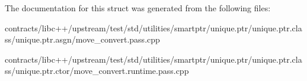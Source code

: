 The documentation for this struct was generated from the following files\+:\begin{DoxyCompactItemize}
\item 
contracts/libc++/upstream/test/std/utilities/smartptr/unique.\+ptr/unique.\+ptr.\+class/unique.\+ptr.\+asgn/move\+\_\+convert.\+pass.\+cpp\item 
contracts/libc++/upstream/test/std/utilities/smartptr/unique.\+ptr/unique.\+ptr.\+class/unique.\+ptr.\+ctor/move\+\_\+convert.\+runtime.\+pass.\+cpp\end{DoxyCompactItemize}

